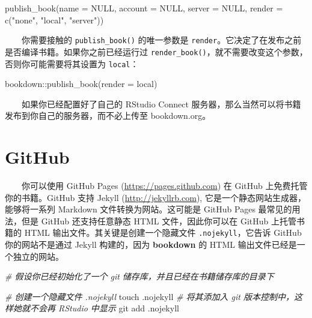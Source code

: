 \documentclass[
  12pt,
]{krantz}
\newenvironment{Shaded}{\begin{snugshade}}{\end{snugshade}}
\newcommand{\AttributeTok}[1]{\textcolor[rgb]{0.77,0.63,0.00}{#1}}
\newcommand{\CommentTok}[1]{\textcolor[rgb]{0.56,0.35,0.01}{\textit{#1}}}
\newcommand{\ConstantTok}[1]{\textcolor[rgb]{0.00,0.00,0.00}{#1}}
\newcommand{\FunctionTok}[1]{\textcolor[rgb]{0.00,0.00,0.00}{#1}}
\newcommand{\NormalTok}[1]{#1}
\newcommand{\SpecialCharTok}[1]{\textcolor[rgb]{0.00,0.00,0.00}{#1}}
\newcommand{\StringTok}[1]{\textcolor[rgb]{0.31,0.60,0.02}{#1}}
\theoremstyle{definition}
\theoremstyle{definition}
\theoremstyle{definition}
\theoremstyle{definition}
\theoremstyle{remark}
\begin{document}
\begin{Shaded}
\begin{Highlighting}[]
\FunctionTok{publish\_book}\NormalTok{(}\AttributeTok{name =} \ConstantTok{NULL}\NormalTok{, }\AttributeTok{account =} \ConstantTok{NULL}\NormalTok{,}
  \AttributeTok{server =} \ConstantTok{NULL}\NormalTok{, }\AttributeTok{render =} \FunctionTok{c}\NormalTok{(}\StringTok{"none"}\NormalTok{, }\StringTok{"local"}\NormalTok{, }\StringTok{"server"}\NormalTok{))}
\end{Highlighting}
\end{Shaded}

  你需要接触的 \texttt{publish\_book()} 的唯一参数是 \texttt{render}。它决定了在发布之前是否编译书籍。如果你之前已经运行过 \texttt{render\_book()}，就不需要改变这个参数，否则你可能需要将其设置为 \texttt{\textquotesingle{}local\textquotesingle{}}：

\begin{Shaded}
\begin{Highlighting}[]
\NormalTok{bookdown}\SpecialCharTok{::}\FunctionTok{publish\_book}\NormalTok{(}\AttributeTok{render =} \StringTok{\textquotesingle{}local\textquotesingle{}}\NormalTok{)}
\end{Highlighting}
\end{Shaded}

  如果你已经配置好了自己的 RStudio Connect 服务器，那么当然可以将书籍发布到你自己的服务器，而不必上传至 bookdown.org。

\hypertarget{github}{%
\section{GitHub}\label{github}}

  你可以使用 GitHub Pages (\url{https://pages.github.com}) 在 GitHub 上免费托管你的书籍。GitHub 支持 Jekyll (\url{http://jekyllrb.com}), 它是一个静态网站生成器，能够将一系列 Markdown 文件转换为网站。这可能是 GitHub Pages 最常见的用法，但是 GitHub 还支持任意静态 HTML 文件，因此你可以在 GitHub 上托管书籍的 HTML 输出文件。其关键是创建一个隐藏文件 \texttt{.nojekyll}，它告诉 GitHub 你的网站不是通过 Jekyll 构建的，因为 \textbf{bookdown} 的 HTML 输出文件已经是一个独立的网站。

\begin{Shaded}
\begin{Highlighting}[]
\CommentTok{\# 假设你已经初始化了一个 git 储存库，并且已经在书籍储存库的目录下}

\CommentTok{\# 创建一个隐藏文件 .nojekyll}
\FunctionTok{touch}\NormalTok{ .nojekyll}
\CommentTok{\# 将其添加入 git 版本控制中，这样她就不会再 RStudio 中显示}
\FunctionTok{git}\NormalTok{ add .nojekyll}
\end{Highlighting}
\end{Shaded}
\end{document}
